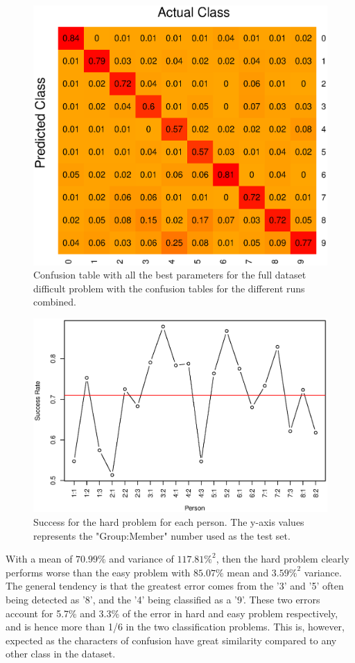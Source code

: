 \begin{figure}[H]
\centering
\includegraphics[width = 0.65 \textwidth]{graphics/knn_confusion_bestparam_hard}
\caption[Confusion table for the hard problem.]{Confusion table with all the best parameters for the full dataset difficult problem with the confusion tables for the different runs combined.}
\label{fig:knn_conf_final_hard}
\end{figure}


\begin{figure}[H]
\centering
\includegraphics[width = 0.95 \textwidth]{graphics/knn_final_full_hard}
\caption[Success for K-NN for the hard problem.]{Success for the hard problem for each person.
The y-axis values represents the "Group:Member" number used as the test set.}
\label{fig:knn_succ_final_hard}
\end{figure}

With a mean of $70.99\%$ and variance of  $117.81\%^2$, then the hard problem clearly performs worse than the easy problem with $85.07\%$ mean and $3.59\%^2$ variance.
The general tendency is that the greatest error comes from the '3' and '5' often being detected as '8', and the '4' being classified as a '9'.
These two errors account for 5.7\% and 3.3\% of the error in hard and easy problem respectively, and is hence more than 1/6 in the two classification problems.
This is, however, expected as the characters of confusion have great similarity compared to any other class in the dataset.

